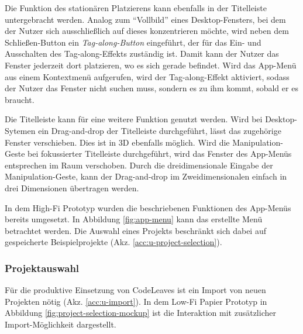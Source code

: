 Die Funktion des stationären Platzierens kann ebenfalls in der Titelleiste untergebracht werden. Analog zum "`Vollbild"' eines Desktop-Fensters, bei dem der Nutzer sich ausschließlich auf dieses konzentrieren möchte, wird neben dem Schließen-Button ein \textit{Tag-along-Button} eingeführt, der für das Ein- und Ausschalten des Tag-along-Effekts zuständig ist. Damit kann der Nutzer das Fenster jederzeit dort platzieren, wo es sich gerade befindet. Wird das App-Menü aus einem Kontextmenü aufgerufen, wird der Tag-along-Effekt aktiviert, sodass der Nutzer das Fenster nicht suchen muss, sondern es zu ihm kommt, sobald er es braucht.

Die Titelleiste kann für eine weitere Funktion genutzt werden. Wird bei Desktop-Sytemen ein Drag-and-drop der Titelleiste durchgeführt, lässt das zugehörige Fenster verschieben. Dies ist in 3D ebenfalls möglich. Wird die Manipulation-Geste bei fokussierter Titelleiste durchgeführt, wird das Fenster des App-Menüs entsprechen im Raum verschoben. Durch die dreidimensionale Eingabe der Manipulation-Geste, kann der Drag-and-drop im Zweidimensionalen einfach in drei Dimensionen übertragen werden.

In dem High-Fi Prototyp wurden die beschriebenen Funktionen des App-Menüs bereits umgesetzt. In Abbildung \ref{fig:app-menu} kann das erstellte Menü betrachtet werden. Die Auswahl eines Projekts beschränkt sich dabei auf gespeicherte Beispielprojekte (Akz. \ref{acc:u-project-selection}).

\subsubsection*{Projektauswahl}

Für die produktive Einsetzung von CodeLeaves ist ein Import von neuen Projekten nötig (Akz. \ref{acc:u-import}). In dem Low-Fi Papier Prototyp in Abbildung \ref{fig:project-selection-mockup} ist die Interaktion mit zusätzlicher Import-Möglichkeit dargestellt.

